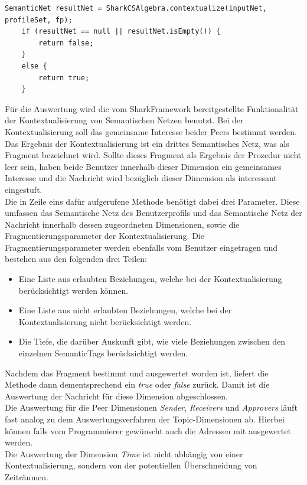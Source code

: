 \begin{lstlisting}
SemanticNet resultNet = SharkCSAlgebra.contextualize(inputNet, profileSet, fp);
	if (resultNet == null || resultNet.isEmpty()) {
		return false;
	}
	else {
		return true;
	}
\end{lstlisting}
Für die Auswertung wird die vom SharkFramework bereitgestellte Funktionalität der Kontextualisierung von Semantischen Netzen benutzt. Bei der Kontextualisierung soll das gemeinsame Interesse beider Peers bestimmt werden. Das Ergebnis der Kontextualisierung ist ein drittes Semantisches Netz, was als Fragment bezeichnet wird. Sollte dieses Fragment als Ergebnis der Prozedur nicht leer sein, haben beide Benutzer innerhalb dieser Dimension ein gemeinsames Interesse und die Nachricht wird bezüglich dieser Dimension als interessant eingestuft.
\\Die in Zeile eins dafür aufgerufene Methode benötigt dabei drei Parameter. Diese umfassen das Semantische Netz des Benutzerprofils und das Semantische Netz der Nachricht innerhalb dessen zugeordneten Dimensionen, sowie die Fragmentierungsparameter der Kontextualisierung. Die Fragmentierungsparameter werden ebenfalls vom Benutzer eingetragen und bestehen aus den folgenden drei Teilen:
\begin{itemize}
	\item Eine Liste aus erlaubten Beziehungen, welche bei der Kontextualisierung berücksichtigt werden können.
	\item Eine Liste aus nicht erlaubten Beziehungen, welche bei der Kontextualisierung nicht berücksichtigt werden.
	\item Die Tiefe, die darüber Auskunft gibt, wie viele Beziehungen zwischen den einzelnen SemanticTags berücksichtigt werden.
\end{itemize}
Nachdem das Fragment bestimmt und ausgewertet worden ist, liefert die Methode dann dementsprechend ein \textit{true} oder \textit{false} zurück. Damit ist die Auswertung der Nachricht für diese Dimension abgeschlossen.
\\Die Auswertung für die Peer Dimensionen \textit{Sender}, \textit{Receivers} und \textit{Approvers} läuft fast analog zu dem Auswertungsverfahren der Topic-Dimensionen ab. Hierbei können falls vom Programmierer gewünscht auch die Adressen mit ausgewertet werden. 
\\Die Auswertung der Dimension \textit{Time} ist nicht abhängig von einer Kontextualisierung, sondern von der potentiellen Überschneidung von Zeiträumen.
\lstset{language=Java, caption=Auswertung der Time-Dimension (Auszug), label=DescriptiveLabel, numbers=left, numbersep=1em, breaklines=true, basicstyle=\small}
